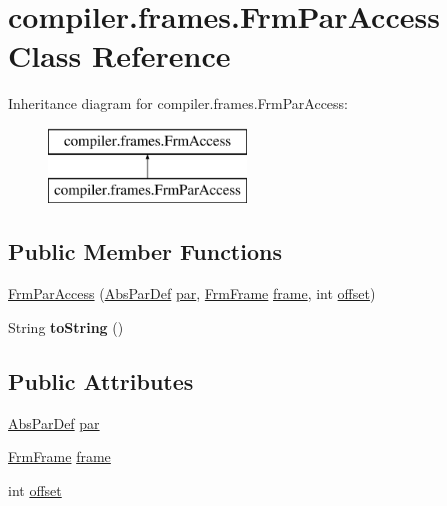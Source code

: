 \hypertarget{classcompiler_1_1frames_1_1_frm_par_access}{}\section{compiler.\+frames.\+Frm\+Par\+Access Class Reference}
\label{classcompiler_1_1frames_1_1_frm_par_access}
Inheritance diagram for compiler.\+frames.\+Frm\+Par\+Access\+:\begin{figure}[H]
\begin{center}
\leavevmode
\includegraphics[height=2.000000cm]{classcompiler_1_1frames_1_1_frm_par_access}
\end{center}
\end{figure}
\subsection*{Public Member Functions}
\begin{DoxyCompactItemize}
\item 
\hyperlink{classcompiler_1_1frames_1_1_frm_par_access_a92613e381aa0a510d739089decf6f3dc}{Frm\+Par\+Access} (\hyperlink{classcompiler_1_1abstr_1_1tree_1_1def_1_1_abs_par_def}{Abs\+Par\+Def} \hyperlink{classcompiler_1_1frames_1_1_frm_par_access_aeebc6111a12c1f3539d4039a11fd7d7c}{par}, \hyperlink{classcompiler_1_1frames_1_1_frm_frame}{Frm\+Frame} \hyperlink{classcompiler_1_1frames_1_1_frm_par_access_aefe8fbc16f7ee24e335f647cead7aee7}{frame}, int \hyperlink{classcompiler_1_1frames_1_1_frm_par_access_a81316f8d58e59c1de53c1fe9af3f78a9}{offset})
\item 
\mbox{\label{classcompiler_1_1frames_1_1_frm_par_access_a25c80e902303a95438740be5fd51385a}} 
String {\bfseries to\+String} ()
\end{DoxyCompactItemize}
\subsection*{Public Attributes}
\begin{DoxyCompactItemize}
\item 
\hyperlink{classcompiler_1_1abstr_1_1tree_1_1def_1_1_abs_par_def}{Abs\+Par\+Def} \hyperlink{classcompiler_1_1frames_1_1_frm_par_access_aeebc6111a12c1f3539d4039a11fd7d7c}{par}
\item 
\hyperlink{classcompiler_1_1frames_1_1_frm_frame}{Frm\+Frame} \hyperlink{classcompiler_1_1frames_1_1_frm_par_access_aefe8fbc16f7ee24e335f647cead7aee7}{frame}
\item 
int \hyperlink{classcompiler_1_1frames_1_1_frm_par_access_a81316f8d58e59c1de53c1fe9af3f78a9}{offset}
\end{DoxyCompactItemize}


